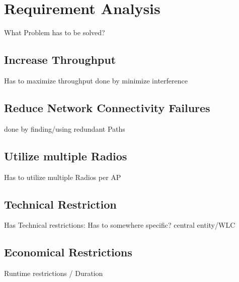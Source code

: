\chapter{Requirement Analysis}
What Problem has to be solved?\newline
\section{Increase Throughput}
  Has to maximize throughput\newline
    done by minimize interference\newline
\section{Reduce Network Connectivity Failures}
  done by finding/using redundant Paths\newline
\section{Utilize multiple Radios}
  Has to utilize multiple Radios per AP\newline
\section{Technical Restriction}
  Has Technical restrictions:\newline
    Has to somewhere specific?\newline
      central entity/WLC\newline
\section{Economical Restrictions}
  Runtime restrictions / Duration\newline
